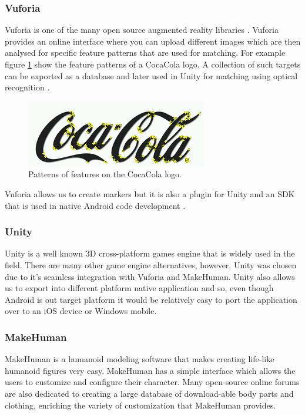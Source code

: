 \documentclass{l4proj}
\begin{document}
\subsubsection{Vuforia}
Vuforia is one of the many open source augmented reality libraries \cite{vuforia}. Vuforia provides an online interface where you can upload different images which are then analysed for specific feature patterns that are used for matching. For example figure \ref{fig:coca_cola_features} show the feature patterns of a CocaCola logo. A collection of such targets can be exported as a database and later used in Unity for matching using optical recognition \cite{vuforia_unity}.
\begin{figure}
\centering
\includegraphics[scale=1]{images/coca_cola_features.png}
\caption{Patterns of features on the CocaCola logo.}
\label{fig:coca_cola_features}
\end{figure}

Vuforia allows us to create markers but it is also a plugin for Unity and an SDK that is used in native Android code development \cite{vuforia_unity}.

\subsubsection{Unity}
Unity is a well known 3D cross-platform games engine that is widely used in the field. There are many other game engine alternatives, however, Unity was chosen due to it's seamless integration with Vuforia and MakeHuman. Unity also allows us to export into different platform native application and so, even though Android is out target platform it would be relatively easy to port the application over to an iOS device or Windows mobile. 

\subsubsection{MakeHuman}
MakeHuman is a humanoid modeling software that makes creating life-like humanoid	 figures very easy. MakeHuman has a simple interface which allows the users to customize and configure their character. Many open-source online forums are also dedicated to creating a large database of download-able body parts and clothing, enriching the variety of customization that MakeHuman provides.
\end{document}

